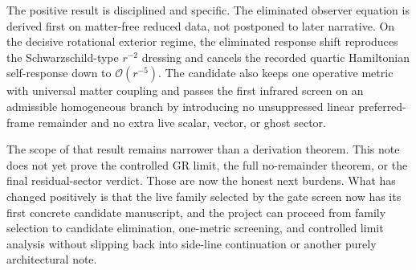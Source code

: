 \documentclass[11pt]{article}
\begin{document}
The positive result is disciplined and specific. The eliminated observer equation is derived first on matter-free reduced data, not postponed to later narrative. On the decisive rotational exterior regime, the eliminated response shift reproduces the Schwarzschild-type \(r^{-2}\) dressing and cancels the recorded quartic Hamiltonian self-response down to \(\mathcal O(r^{-5})\). The candidate also keeps one operative metric with universal matter coupling and passes the first infrared screen on an admissible homogeneous branch by introducing no unsuppressed linear preferred-frame remainder and no extra live scalar, vector, or ghost sector.

The scope of that result remains narrower than a derivation theorem. This note does not yet prove the controlled GR limit, the full no-remainder theorem, or the final residual-sector verdict. Those are now the honest next burdens. What has changed positively is that the live family selected by the gate screen now has its first concrete candidate manuscript, and the project can proceed from family selection to candidate elimination, one-metric screening, and controlled limit analysis without slipping back into side-line continuation or another purely architectural note.
\end{document}
